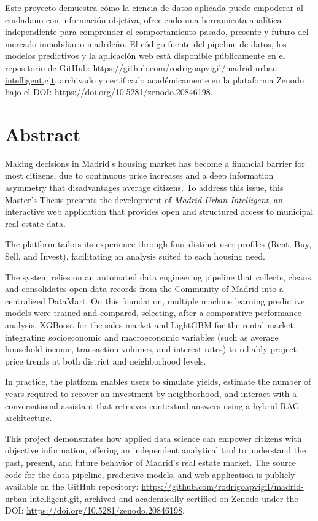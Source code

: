 \documentclass[a4paper,11pt,openany]{book}
\begin{document}
Este proyecto demuestra cómo la ciencia de datos aplicada puede empoderar al ciudadano con información objetiva, ofreciendo una herramienta analítica independiente para comprender el comportamiento pasado, presente y futuro del mercado inmobiliario madrileño. El código fuente del pipeline de datos, los modelos predictivos y la aplicación web está disponible públicamente en el repositorio de GitHub: \url{https://github.com/rodrigoapvigil/madrid-urban-intelligent.git}, archivado y certificado académicamente en la plataforma Zenodo bajo el DOI: \url{https://doi.org/10.5281/zenodo.20846198}.

\chapter*{Abstract}
Making decisions in Madrid’s housing market has become a financial barrier for most citizens, due to continuous price increases and a deep information asymmetry that disadvantages average citizens. To address this issue, this Master’s Thesis presents the development of \textit{Madrid Urban Intelligent}, an interactive web application that provides open and structured access to municipal real estate data.

The platform tailors its experience through four distinct user profiles (Rent, Buy, Sell, and Invest), facilitating an analysis suited to each housing need.

The system relies on an automated data engineering pipeline that collects, cleans, and consolidates open data records from the Community of Madrid into a centralized DataMart. On this foundation, multiple machine learning predictive models were trained and compared, selecting, after a comparative performance analysis, XGBoost for the sales market and LightGBM for the rental market, integrating socioeconomic and macroeconomic variables (such as average household income, transaction volumes, and interest rates) to reliably project price trends at both district and neighborhood levels.

In practice, the platform enables users to simulate yields, estimate the number of years required to recover an investment by neighborhood, and interact with a conversational assistant that retrieves contextual answers using a hybrid RAG architecture.

This project demonstrates how applied data science can empower citizens with objective information, offering an independent analytical tool to understand the past, present, and future behavior of Madrid’s real estate market. The source code for the data pipeline, predictive models, and web application is publicly available on the GitHub repository: \url{https://github.com/rodrigoapvigil/madrid-urban-intelligent.git}, archived and academically certified on Zenodo under the DOI: \url{https://doi.org/10.5281/zenodo.20846198}.
\end{document}
